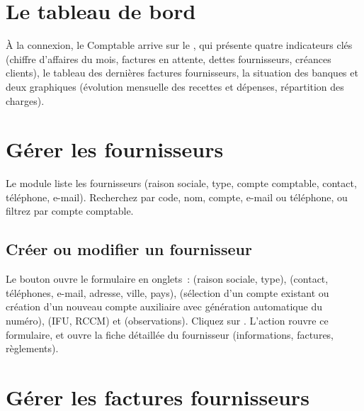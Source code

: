 \section{Le tableau de bord}

À la connexion, le Comptable arrive sur le , qui présente quatre indicateurs clés (chiffre d'affaires du mois, factures en attente, dettes fournisseurs, créances clients), le tableau des dernières factures fournisseurs, la situation des banques et deux graphiques (évolution mensuelle des recettes et dépenses, répartition des charges).


\section{Gérer les fournisseurs}

Le module  liste les fournisseurs (raison sociale, type, compte comptable, contact, téléphone, e-mail). Recherchez par code, nom, compte, e-mail ou téléphone, ou filtrez par compte comptable.

\subsection{Créer ou modifier un fournisseur}

Le bouton  ouvre le formulaire en onglets~:  (raison sociale, type),  (contact, téléphones, e-mail, adresse, ville, pays),  (sélection d'un compte existant ou création d'un nouveau compte auxiliaire avec génération automatique du numéro),  (IFU, RCCM) et  (observations). Cliquez sur . L'action  rouvre ce formulaire, et  ouvre la fiche détaillée du fournisseur (informations, factures, règlements).


\section{Gérer les factures fournisseurs}

